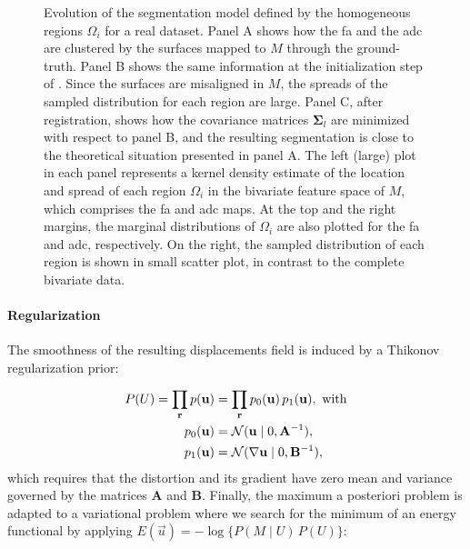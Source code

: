 \begin{figure}
\caption{%
Evolution of the segmentation model defined by the homogeneous regions $\Omega_i$
  for a real dataset.
Panel A shows how the \gls*{fa} and the \gls*{adc} are clustered by the surfaces mapped to
  $M$ through the ground-truth.
Panel B shows the same information at the initialization step of \regseg{}.
Since the surfaces are misaligned in $M$, the spreads of the sampled distribution for
  each region are large.
Panel C, after \regseg{} registration, shows how the covariance matrices $\boldsymbol{\Sigma}_l$ 
  are minimized with respect to panel B, and the resulting segmentation is close
  to the theoretical situation presented in panel A.
The left (large) plot in each panel represents a kernel density estimate of the location and spread of
  each region $\Omega_i$ in the bivariate feature space of $M$, which comprises
  the \gls*{fa} and \gls*{adc} maps.
At the top and the right margins, the marginal distributions of $\Omega_i$ are also plotted for
  the \gls*{fa} and \gls*{adc}, respectively.
On the right, the sampled distribution of each region is shown in small scatter plot, in contrast to
  the complete bivariate data.
}\label{fig:model}
\end{figure}

\paragraph*{Regularization}
The smoothness of the resulting displacements field is induced by a Thikonov regularization
  prior:

  \begin{align}
  P(U) = \underset{\vec{r}}{\prod}\, p(\vec{u}) &=
  \underset{\vec{r}}{\prod}\, p_0(\vec{u}) \, p_1(\vec{u}), \text{ with} \\
  p_0(\vec{u}) &= \mathcal{N}( \vec{u} \mid 0, \mathbf{A}^{-1}), \notag\\
  p_1(\vec{u}) &= \mathcal{N}(  \nabla \vec{u} \mid 0, \mathbf{B}^{-1}),
  \label{eq:thikonov}
  \end{align}
 which requires that the distortion and its gradient have zero
  mean and variance governed by the matrices $\mathbf{A}$ and $\mathbf{B}$.
Finally, the maximum a posteriori problem is adapted to a variational problem where we search for
  the minimum of an energy functional by applying $E(\vec{u}) = -\log \{P( M \mid U) \, P(U)\}$:

